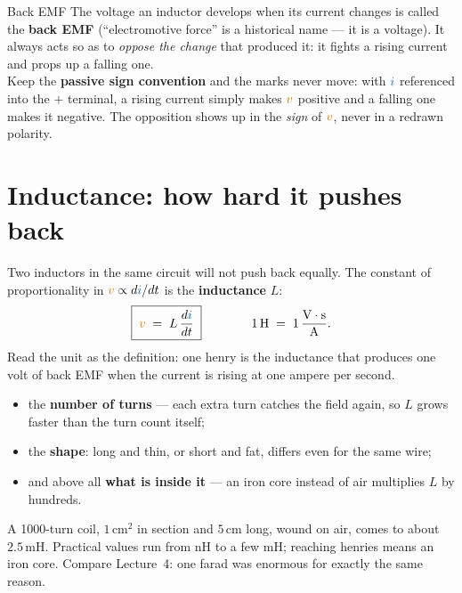 \documentclass[11pt,a4paper]{article}
\newcommand{\Icol}[1]{\textcolor{ccur}{#1}}
\newcommand{\Vcol}[1]{\textcolor{cvolt}{#1}}
\newcommand{\uni}[1]{\,\mathrm{#1}}
\begin{document}
\begin{definitionbox}{Back EMF}
The voltage an inductor develops when its current changes is called the \textbf{back EMF}
(``electromotive force'' is a historical name --- it is a voltage). It always acts so as to
\emph{oppose the change} that produced it: it fights a rising current and props up a
falling one.\\[4pt]
Keep the \textbf{passive sign convention} and the marks never move: with $\Icol{i}$
referenced into the $+$ terminal, a rising current simply makes $\Vcol{v}$ positive and a
falling one makes it negative. The opposition shows up in the \emph{sign} of $\Vcol{v}$,
never in a redrawn polarity.
\end{definitionbox}

\section{Inductance: how hard it pushes back}

Two inductors in the same circuit will not push back equally. The constant of proportionality
in $\Vcol{v} \propto d\Icol{i}/dt$ is the \textbf{inductance} $L$:
\[
  \boxed{\;\Vcol{v} \;=\; L\,\frac{d\Icol{i}}{dt}\;}
  \qquad\qquad
  1\Hy \;=\; 1\,\frac{\mathrm{V}\cdot\mathrm{s}}{\mathrm{A}} .
\]
Read the unit as the definition: one henry is the inductance that produces one volt of
back EMF when the current is rising at one ampere per second.

\begin{ideabox}
\begin{itemize}
  \item the \textbf{number of turns} --- each extra turn catches the field again, so $L$
        grows faster than the turn count itself;
  \item the \textbf{shape}: long and thin, or short and fat, differs even for the same
        wire;
  \item and above all \textbf{what is inside it} --- an iron core instead of air
        multiplies $L$ by hundreds.
\end{itemize}
\end{ideabox}
\vspace{2pt}

\begin{cautionbox}
A 1000-turn coil, $1\uni{cm}^2$ in section and $5\uni{cm}$ long, wound on air, comes to
about $2.5\uni{mH}$. Practical values run from nH to a few mH; reaching henries means an
iron core. Compare Lecture~4: one farad was enormous for exactly the same reason.
\end{cautionbox}
\end{document}
